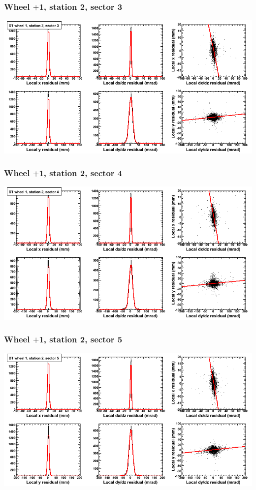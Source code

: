 \documentclass[compress]{beamer}
\begin{document}
\begin{frame}
\frametitle{Wheel $+$1, station 2, sector 3}
\includegraphics[width=\linewidth]{tmpbell_MBwhDst2sec03.png}
\end{frame}

\begin{frame}
\frametitle{Wheel $+$1, station 2, sector 4}
\includegraphics[width=\linewidth]{tmpbell_MBwhDst2sec04.png}
\end{frame}

\begin{frame}
\frametitle{Wheel $+$1, station 2, sector 5}
\includegraphics[width=\linewidth]{tmpbell_MBwhDst2sec05.png}
\end{frame}
\end{document}
